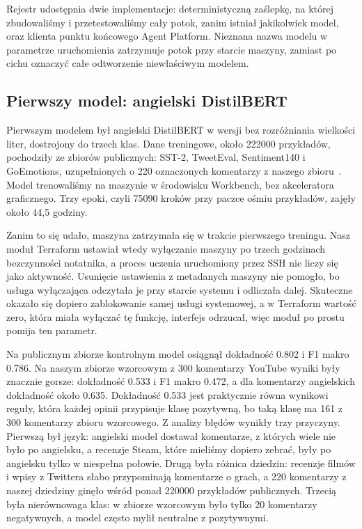 Rejestr udostępnia dwie implementacje: deterministyczną zaślepkę, na której zbudowaliśmy i przetestowaliśmy cały potok, zanim istniał jakikolwiek model, oraz klienta punktu końcowego Agent Platform.
Nieznana nazwa modelu w parametrze uruchomienia zatrzymuje potok przy starcie maszyny, zamiast po cichu oznaczyć całe odtworzenie niewłaściwym modelem.

\subsection{Pierwszy model: angielski DistilBERT}
\label{sec:impl-distilbert}

Pierwszym modelem był angielski DistilBERT w wersji bez rozróżniania wielkości liter, dostrojony do trzech klas.
Dane treningowe, około \num{222000} przykładów, pochodziły ze zbiorów publicznych: SST-2, TweetEval, Sentiment140 i GoEmotions, uzupełnionych o 220 oznaczonych komentarzy z naszego zbioru~\cite{socher2013recursive,barbieri2020tweeteval,go2009twitter,demszky2020goemotions}.
Model trenowaliśmy na maszynie  w środowisku Workbench, bez akceleratora graficznego.
Trzy epoki, czyli \num{75090} kroków przy paczce ośmiu przykładów, zajęły około 44,5 godziny.

Zanim to się udało, maszyna zatrzymała się w trakcie pierwszego treningu.
Nasz moduł Terraform ustawiał wtedy wyłączanie maszyny po trzech godzinach bezczynności notatnika, a proces uczenia uruchomiony przez SSH nie liczy się jako aktywność.
Usunięcie ustawienia z metadanych maszyny nie pomogło, bo usługa wyłączająca odczytała je przy starcie systemu i odliczała dalej.
Skuteczne okazało się dopiero zablokowanie samej usługi systemowej, a w Terraform wartość zero, która miała wyłączać tę funkcję, interfejs odrzucał, więc moduł po prostu pomija ten parametr.

Na publicznym zbiorze kontrolnym model osiągnął dokładność \num{0.802} i F1 makro \num{0.786}.
Na naszym zbiorze wzorcowym z 300 komentarzy YouTube wyniki były znacznie gorsze: dokładność \num{0.533} i F1 makro \num{0.472}, a dla komentarzy angielskich dokładność około \num{0.635}.
Dokładność \num{0.533} jest praktycznie równa wynikowi reguły, która każdej opinii przypisuje klasę pozytywną, bo taką klasę ma 161 z 300 komentarzy zbioru wzorcowego.
Z analizy błędów wynikły trzy przyczyny.
Pierwszą był język: angielski model dostawał komentarze, z których wiele nie było po angielsku, a recenzje Steam, które mieliśmy dopiero zebrać, były po angielsku tylko w niespełna połowie.
Drugą była różnica dziedzin: recenzje filmów i wpisy z Twittera słabo przypominają komentarze o grach, a 220 komentarzy z naszej dziedziny ginęło wśród ponad \num{220000} przykładów publicznych.
Trzecią była nierównowaga klas: w zbiorze wzorcowym było tylko 20 komentarzy negatywnych, a model często mylił neutralne z pozytywnymi.

